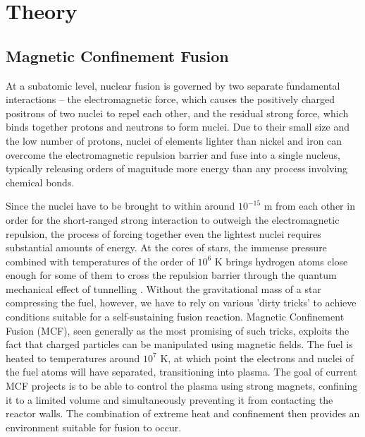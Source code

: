 \chapter{Theory}

\section{Magnetic Confinement Fusion}
At a subatomic level, nuclear fusion is governed by two separate fundamental interactions -- the electromagnetic force, which causes the positively charged positrons of two nuclei to repel each other, and the residual strong force, which binds together protons and neutrons to form nuclei. 
Due to their small size and the low number of protons, nuclei of elements lighter than nickel and iron can overcome the electromagnetic repulsion barrier and fuse into a single nucleus, typically releasing orders of magnitude more energy than any process involving chemical bonds.

Since the nuclei have to be brought to within around $10^{-15}$ m from each other in order for the short-ranged strong interaction to outweigh the electromagnetic repulsion, the process of forcing together even the lightest nuclei requires substantial amounts of energy.  
At the cores of stars, the immense pressure combined with temperatures of the order of $10^6$ K brings hydrogen atoms close enough for some of them to cross the repulsion barrier through the quantum mechanical effect of tunnelling \cite{clayton1983principles}.
Without the gravitational mass of a star compressing the fuel, however, we have to rely on various 'dirty tricks' to achieve conditions suitable for a self-sustaining fusion reaction. 
Magnetic Confinement Fusion (MCF), seen generally as the most promising of such tricks, exploits the fact that charged particles can be manipulated using magnetic fields. 
The fuel is heated to temperatures around $10^7$ K, at which point the electrons and nuclei of the fuel atoms will have separated, transitioning into plasma. 
The goal of current MCF projects is to be able to control the plasma using strong magnets, confining it to a limited volume and simultaneously preventing it from contacting the reactor walls.
The combination of extreme heat and confinement then provides an environment suitable for fusion to occur.

